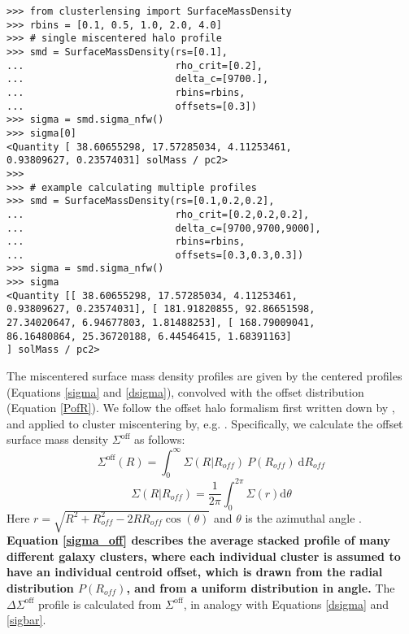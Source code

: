 \documentclass[twocolumn]{aastex6}
\begin{document}
\begin{verbatim}
>>> from clusterlensing import SurfaceMassDensity
>>> rbins = [0.1, 0.5, 1.0, 2.0, 4.0]
>>> # single miscentered halo profile
>>> smd = SurfaceMassDensity(rs=[0.1],
...                          rho_crit=[0.2],
...                          delta_c=[9700.],
...                          rbins=rbins,
...                          offsets=[0.3])
>>> sigma = smd.sigma_nfw()
>>> sigma[0]
<Quantity [ 38.60655298, 17.57285034, 4.11253461,
0.93809627, 0.23574031] solMass / pc2>
>>> 
>>> # example calculating multiple profiles
>>> smd = SurfaceMassDensity(rs=[0.1,0.2,0.2],
...                          rho_crit=[0.2,0.2,0.2],
...                          delta_c=[9700,9700,9000],
...                          rbins=rbins,
...                          offsets=[0.3,0.3,0.3])
>>> sigma = smd.sigma_nfw()
>>> sigma
<Quantity [[ 38.60655298, 17.57285034, 4.11253461, 
0.93809627, 0.23574031], [ 181.91820855, 92.86651598, 
27.34020647, 6.94677803, 1.81488253], [ 168.79009041, 
86.16480864, 25.36720188, 6.44546415, 1.68391163]
] solMass / pc2>
\end{verbatim}

The miscentered surface mass density profiles are given by the centered profiles (Equations \ref{sigma} and \ref{dsigma}), convolved with the offset distribution (Equation \ref{PofR}). We follow the offset halo formalism first written down by \citet{Yang06}, and applied to cluster miscentering by, e.g. \citet{Johnston07, George12, Ford14, Ford15, Simet16}. Specifically, we calculate the offset surface mass density $\Sigma^\mathrm{off}$ as follows:
\begin{equation}\label{sigma_off}
\Sigma^\mathrm{off}(R) = \int_{0}^{\infty} \Sigma(R | R_{off})\ P(R_{off})\  \mathrm{d}R_{off}
\end{equation}
\begin{equation}\label{sigma_RgivenRoff}
\Sigma(R|R_{off})=\frac{1}{2\pi}\int_{0}^{2\pi}\Sigma(r) \mathrm{d}\theta
\end{equation}
Here $r = \sqrt{R^2+R_{off}^2-2RR_{off}\cos(\theta)}$ and $\theta$ is the azimuthal angle \citep{Yang06}. {\bf Equation \ref{sigma_off} describes the average stacked profile of many different galaxy clusters, where each individual cluster is assumed to have an individual centroid offset, which is drawn from the radial distribution $P(R_{off})$, and from a uniform distribution in angle.} The $\Delta\Sigma^\mathrm{off}$ profile is calculated from $\Sigma^\mathrm{off}$, in analogy with Equations \ref{dsigma} and \ref{sigbar}.
\end{document}
